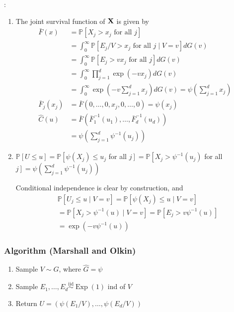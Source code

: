 : 
\begin{enumerate}[label = (\arabic*), leftmargin=*]
    \item The joint survival function of $\operatorname{\boldsymbol{\mathbf{X}}}$ is given by
$$
\begin{aligned}
\bar{F}(x) &=\mathbb{P}\left[X_{j}>x_{j} \text { for all } j\right] \\
&=\int_{0}^{\infty} \mathbb{P}\left[E_{j} / V>x_{j} \text { for all } j \mid V=v\right] d G(v) \\
&=\int_{0}^{\infty} \mathbb{P}\left[E_{j}>v x_{j} \text { for all } j\right] d G(v) \\
&=\int_{0}^{\infty} \prod_{j=1}^{d} \exp \left(-v x_{j}\right) d G(v) \\
&=\int_{0}^{\infty} \exp \left(-v \sum_{j=1}^{d} x_{j}\right) d G(v)=\psi\left(\sum_{j=1}^{d} x_{j}\right) \\
\bar{F}_{j}\left(x_{j}\right) &=\bar{F}\left(0, \ldots, 0, x_{j}, 0, \ldots, 0\right)=\psi\left(x_{j}\right) \\
\hat{C}(u) &=\bar{F}\left(\bar{F}_{1}^{-1}\left(u_{1}\right), \ldots, \bar{F}_{d}^{-1}\left(u_{d}\right)\right)\\
&=\psi\left(\sum_{j=1}^{d} \psi^{-1}\left(u_{j}\right)\right)
\end{aligned}
$$
    \item $\mathbb{P}[U \leq u]=\mathbb{P}\left[\psi\left(X_{j}\right) \leq u_{j}\right.$ for all $\left.j\right]=\mathbb{P}\left[X_{j}>\psi^{-1}\left(u_{j}\right)\right.$ for all $\left.j\right]=\psi\left(\sum_{j=1}^{d} \psi^{-1}\left(u_{j}\right)\right)$ 
    
    Conditional independence is clear by construction, and
$$
\begin{aligned}
&\mathbb{P}\left[U_{j} \leq u \mid V=v\right]=\mathbb{P}\left[\psi\left(X_{j}\right) \leq u \mid V=v\right] \\
&=\mathbb{P}\left[X_{j}>\psi^{-1}(u) \mid V=v\right]=\mathbb{P}\left[E_{j}>v \psi^{-1}(u)\right] \\
&=\exp \left(-v \psi^{-1}(u)\right)
\end{aligned}
$$
\end{enumerate}





\subsubsection*{Algorithm (Marshall and Olkin)}
\begin{enumerate}[label = (\arabic*), leftmargin=*]
    \item Sample $V \sim G$, where $\hat{G}=\psi$
    \item Sample $E_{1}, \ldots, E_{d} \stackrel{\mathrm{iid}}{\sim} \operatorname{Exp}(1)$ ind of $V$
    \item Return $U=\left(\psi\left(E_{1} / V\right), \ldots, \psi\left(E_{d} / V\right)\right)$
\end{enumerate}








